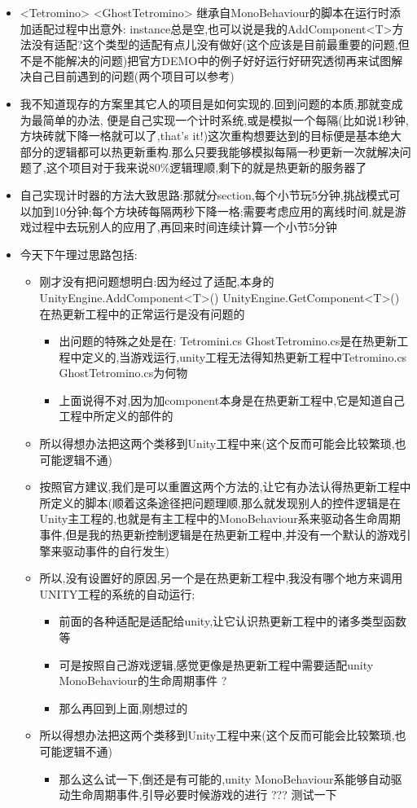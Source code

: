 \documentclass[9pt, b5paper]{article}
\begin{document}
\begin{itemize}
\begin{itemize}
\item <Tetromino> <GhostTetromino> 继承自MonoBehaviour的脚本在运行时添加适配过程中出意外: instance总是空,也可以说是我的AddComponent<T>方法没有适配?这个类型的适配有点儿没有做好(这个应该是目前最重要的问题,但不是不能解决的问题)把官方DEMO中的例子好好运行好研究透彻再来试图解决自己目前遇到的问题(两个项目可以参考)
\item 我不知道现存的方案里其它人的项目是如何实现的.回到问题的本质,那就变成为最简单的办法, 便是自己实现一个计时系统,或是模拟一个每隔(比如说1秒钟,方块砖就下降一格就可以了,that's it!)这次重构想要达到的目标便是基本绝大部分的逻辑都可以热更新重构.那么只要我能够模拟每隔一秒更新一次就解决问题了,这个项目对于我来说80\%逻辑理顺,剩下的就是热更新的服务器了
\item 自己实现计时器的方法大致思路:那就分section,每个小节玩5分钟,挑战模式可以加到10分钟;每个方块砖每隔两秒下降一格;需要考虑应用的离线时间,就是游戏过程中去玩别人的应用了,再回来时间连续计算一个小节5分钟
\item 今天下午理过思路包括:
\begin{itemize}
\item 刚才没有把问题想明白:因为经过了适配,本身的UnityEngine.AddComponent<T>() UnityEngine.GetComponent<T>() 在热更新工程中的正常运行是没有问题的
\begin{itemize}
\item 出问题的特殊之处是在: Tetromini.cs GhostTetromino.cs是在热更新工程中定义的,当游戏运行,unity工程无法得知热更新工程中Tetromino.cs GhostTetromino.cs为何物
\item 上面说得不对,因为加component本身是在热更新工程中,它是知道自己工程中所定义的部件的
\end{itemize}
\item 所以得想办法把这两个类移到Unity工程中来(这个反而可能会比较繁琐,也可能逻辑不通)
\item 按照官方建议,我们是可以重置这两个方法的,让它有办法认得热更新工程中所定义的脚本(顺着这条途径把问题理顺,那么就发现别人的控件逻辑是在Unity主工程的,也就是有主工程中的MonoBehaviour系来驱动各生命周期事件,但是我的热更新控制逻辑是在热更新工程中,并没有一个默认的游戏引擎来驱动事件的自行发生)
\item 所以,没有设置好的原因,另一个是在热更新工程中,我没有哪个地方来调用UNITY工程的系统的自动运行;
\begin{itemize}
\item 前面的各种适配是适配给unity,让它认识热更新工程中的诸多类型函数等
\item 可是按照自己游戏逻辑,感觉更像是热更新工程中需要适配unity MonoBehaviour的生命周期事件 ?
\item 那么再回到上面,刚想过的
\end{itemize}
\item 所以得想办法把这两个类移到Unity工程中来(这个反而可能会比较繁琐,也可能逻辑不通)
\begin{itemize}
\item 那么这么试一下,倒还是有可能的,unity MonoBehaviour系能够自动驱动生命周期事件,引导必要时候游戏的进行 ??? 测试一下
\end{itemize}
\end{itemize}
\end{itemize}


\end{itemize}
\end{document}
